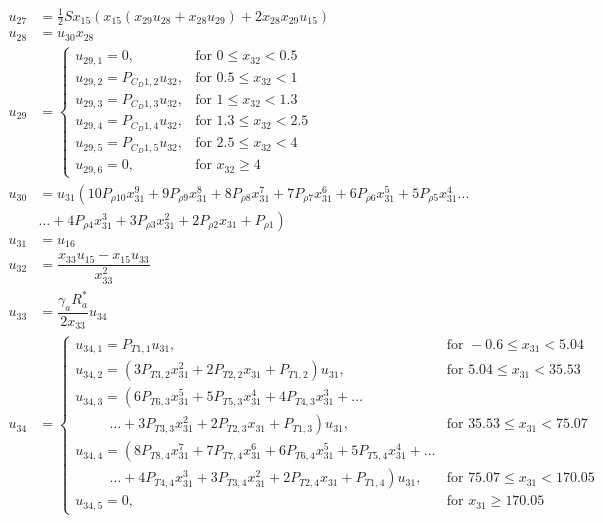 \begin{equation} \label{eq:unAuxEq3}
\begin{split}
u_{27} &=  \frac{1}{2}Sx_{15}\left(x_{15} \left(x_{29}u_{28}+x_{28}u_{29}\right)+2x_{28}x_{29}u_{15}\right) \\
u_{28} &= u_{30}x_{28} \\
u_{29} &=\begin{cases}
u_{29,1}=0, & \text{for } 0\leq x_{32} < 0.5\\
u_{29,2}=P_{C_{D} 1,2}u_{32}, &  \text{for } 0.5\leq x_{32} < 1 \\
u_{29,3}=P_{C_{D} 1,3}u_{32}, &  \text{for } 1\leq x_{32} < 1.3 \\
u_{29,4}=P_{C_{D} 1,4}u_{32}, &  \text{for } 1.3\leq x_{32} < 2.5 \\
u_{29,5}=P_{C_{D} 1,5}u_{32}, &  \text{for } 2.5\leq x_{32} < 4 \\
u_{29,6}=0, &  \text{for } x_{32} \geq 4 
\end{cases}\\
u_{30} &=u_{31} \left(10 P_{\rho 10}x_{31}^{9}+9 P_{\rho 9}x_{31}^{8}+8 P_{\rho 8}x_{31}^{7}+7 P_{\rho 7}x_{31}^{6}+6 P_{\rho 6}x_{31}^{5}+5 P_{\rho 5}x_{31}^{4}\dots \right. \\
& \left. \dotsc +4 P_{\rho 4}x_{31}^{3}+3 P_{\rho 3}x_{31}^{2}+2 P_{\rho 2}x_{31}+P_{\rho 1}\right) \\
u_{31} &= u_{16}\\
u_{32} &= \dfrac{x_{33}u_{15}-x_{15}u_{33}}{x_{33}^{2}}\\
u_{33} &= \dfrac{\gamma_{a}R_{a}^{*}}{2x_{33}}u_{34} \\
u_{34}&=\begin{cases}
u_{34,1}=P_{T 1,1}u_{31}, & \text{for } -0.6 \leq x_{31} < 5.04  \\
u_{34,2}=\left(3P_{T 3,2}x_{31}^{2}+2P_{T 2,2}x_{31}+P_{T 1,2}\right)u_{31}, &  \text{for } 5.04\leq x_{31} < 35.53   \\
u_{34,3}=\left(6 P_{T 6,3}x_{31}^{5}+5P_{T 5,3}x_{31}^{4}+4P_{T 4,3}x_{31}^{3}+\dots \right. \\
\qquad \ \  \left. \dotsc +3P_{T 3,3}x_{31}^{2}+2P_{T 2,3}x_{31}+P_{T 1,3}\right)u_{31}, &  \text{for } 35.53\leq x_{31} < 75.07   \\
u_{34,4}=\left(8 P_{T 8,4}x_{31}^{7}+7P_{T 7,4}x_{31}^{6}+6P_{T 6,4}x_{31}^{5}+5P_{T 5,4}x_{31}^{4} + \dots \right. \\
\qquad \ \  \left. \dotsc +4P_{T 4,4}x_{31}^{3}+3P_{T 3,4}x_{31}^{2}+2P_{T 2,4}x_{31}+P_{T 1,4}\right)u_{31}, &  \text{for } 75.07\leq x_{31} < 170.05   \\
u_{34,5}=0, &  \text{for }  x_{31} \geq 170.05   
\end{cases}
\end{split}
\end{equation}




